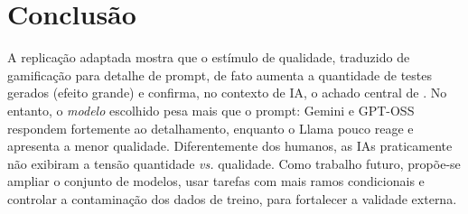 \documentclass[12pt]{article}
\begin{document}
\section{Conclusão}

A replicação adaptada mostra que o estímulo de qualidade, traduzido de
gamificação para detalhe de prompt, de fato aumenta a quantidade de testes
gerados (efeito grande) e confirma, no contexto de IA, o achado central de
\cite{straubinger2025}. No entanto, o \emph{modelo} escolhido pesa mais que o
prompt: Gemini e GPT-OSS respondem fortemente ao detalhamento, enquanto o Llama
pouco reage e apresenta a menor qualidade. Diferentemente dos humanos, as IAs
praticamente não exibiram a tensão quantidade \emph{vs.} qualidade. Como trabalho
futuro, propõe-se ampliar o conjunto de modelos, usar tarefas com mais ramos
condicionais e controlar a contaminação dos dados de treino, para fortalecer a
validade externa.



\end{document}
